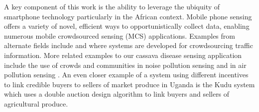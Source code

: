\documentclass[letterpaper]{article} %
\begin{document}
A key component of this work is the ability to leverage the ubiquity of smartphone technology particularly in the African context. Mobile phone sensing offers a variety of novel, efficient ways to opportunistically collect data, enabling numerous mobile crowdsourced sensing (MCS) applications. Examples from alternate fields include \cite{mohan2008nericell} and \cite{thiagarajan2009vtrack} where systems are developed for crowdsourcing traffic information. More related examples to our cassava disease sensing application include the use of crowds and communities in noise pollution sensing \cite{rana2010ear} and in air pollution sensing \cite{stevens2010crowdsourcing}. An even closer example of a system using different incentives to link credible buyers to sellers of market produce in Uganda is the Kudu system \cite{ssekibuule2013mobile} which uses a double auction design algorithm to link buyers and sellers of agricultural produce. 
\\




\end{document}
